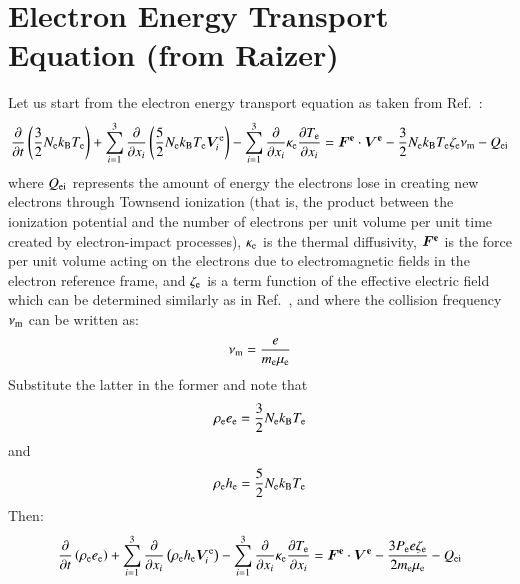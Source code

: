 \documentclass{warpdoc}
\renewcommand{\vec}[1]{\bm{#1}}
\begin{document}
\section{Electron Energy Transport Equation (from Raizer)}

Let us start from the electron energy transport equation as taken from Ref.\ \cite[page 34]{book:1991:raizer}:
%
\begin{equation}
  \frac{\partial }{\partial t} \left( \frac{3}{2} N_{\rm e} k_{\rm B} T_{\rm e} \right)
  + \sum_{i=1}^3 \frac{\partial }{\partial x_i} \left(\frac{5}{2}  N_{\rm e} k_{\rm B} T_{\rm e} \vec{V}_i^{\rm e} \right)
  - \sum_{i=1}^3 \frac{\partial }{\partial x_i} \kappa_{\rm e} \frac{\partial T_{\rm e}}{\partial x_i}
  =
   \vec{F^{\rm e}}\cdot \vec{V^{\rm e}}
 - \frac{3}{2} N_{\rm e} k_{\rm B} T_{\rm e} \zeta_{\rm e} \nu_{\rm m} - Q_{\rm ei}  
 \end{equation}
%
where $Q_{\rm ei}$ represents the amount of energy the electrons lose in creating new electrons through Townsend
ionization (that is, the product between the ionization potential and the number of electrons per unit volume per unit time created by electron-impact processes), $\kappa_{\rm e}$ is the thermal diffusivity,  $\vec{F^{\rm e}}$ is the force per unit volume acting on the electrons due to electromagnetic fields in the electron reference frame, and $\zeta_{\rm e}$ is a term function of the effective electric field which can be determined similarly as in Ref.\ \cite{misc:1995:boeuf}, and where the collision frequency $\nu_{\rm m}$ can be written as:
%
\begin{equation}
\nu_{\rm m}=\frac{e}{m_{\rm e}\mu_{\rm e}}
\end{equation}
%
Substitute the latter in the former and note that 
%
\begin{equation}
\rho_{\rm e} e_{\rm e} = \frac{3}{2} N_{\rm e} k_{\rm B} T_{\rm e}
\end{equation}
%
and
%
\begin{equation}
\rho_{\rm e}  h_{\rm e} = \frac{5}{2} N_{\rm e} k_{\rm B} T_{\rm e}
\end{equation}
%
Then:
%
\begin{equation}
  \frac{\partial }{\partial t} \left( \rho_{\rm e} e_{\rm e} \right)
  + \sum_{i=1}^3 \frac{\partial }{\partial x_i} \left(\rho_{\rm e} h_{\rm e} \vec{V}_i^{\rm e} \right)
  - \sum_{i=1}^3 \frac{\partial }{\partial x_i} \kappa_{\rm e} \frac{\partial T_{\rm e}}{\partial x_i}
  =
   \vec{F^{\rm e}}\cdot \vec{V^{\rm e}}
 -    \frac{3 P_{\rm e}  e \zeta_{\rm e}}{2 m_{\rm e}\mu_{\rm e}} - Q_{\rm ei}  
 \end{equation}
\end{document}
